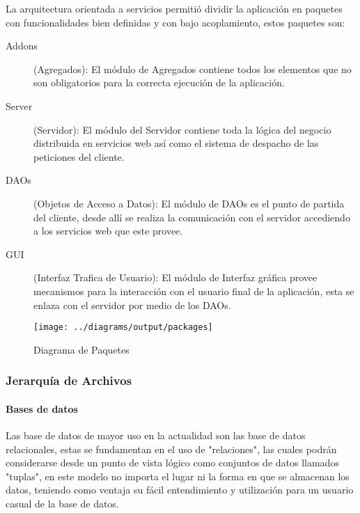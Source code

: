 La arquitectura orientada a servicios permitió dividir la aplicación en paquetes con funcionalidades bien definidas y con bajo acoplamiento, estos paquetes son:

\begin{description}
	
	\item[Addons] (Agregados):\newline
	El módulo de Agregados contiene todos los elementos que no son obligatorios para la correcta ejecución de la aplicación.
	
	\item[Server] (Servidor):\newline
	El módulo del Servidor contiene toda la lógica del negocio distribuida en servicios web así como el sistema de despacho de las peticiones del cliente.
	
	\item[DAOs] (Objetos de Acceso a Datos):\newline
	El módulo de DAOs es el punto de partida del cliente, desde allí se realiza la comunicación con el servidor accediendo a los servicios web que este provee.
	
	\item[GUI] (Interfaz Trafica de Usuario):\newline
	El módulo de Interfaz gráfica provee mecanismos para la interacción con el usuario final de la aplicación, esta se enlaza con el servidor por medio de los DAOs.
	
\end{description}

\begin{landscape}
\begin{figure}
 \centering
 \texttt{[image: ../diagrams/output/packages]}
 \caption{Diagrama de Paquetes}
 \label{diagrama:paquetes}
\end{figure}
\end{landscape}


\subsubsection{Jerarquía de Archivos}

\paragraph{Bases de datos}

Las base de datos de mayor uso en la actualidad son las base de datos relacionales, estas se fundamentan en el uso de "relaciones", las cuales podrán considerarse desde un punto de vista lógico como conjuntos de datos llamados "tuplas", en este modelo no importa el lugar ni la forma en que se almacenan los datos, teniendo como ventaja su fácil entendimiento y utilización para un usuario casual de la base de datos.

